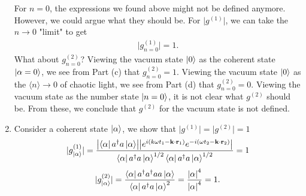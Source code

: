 \documentclass{article}
\theoremstyle{definition}
\newcommand{\al}{\alpha}
\newcommand{\f}[2]{\frac{#1}{#2}}
\begin{document}
\begin{enumerate}[label=\alph*)]
\noindent For $n=0$, the expressions we found above might not be defined anymore. However, we could argue what they should be. For $\vert g^{(1)} \vert$, we can take the $n\to 0$ "limit" to get
\begin{align*}
\vert g_{n=0}^{(1)}  \vert = 1.
\end{align*}
What about $g_{n=0}^{(2)}$? Viewing the vacuum state $\ket{0}$ as the coherent state $\ket{\al = 0}$, we see from Part (c) that $g^{(2)}_{n=0} = 1$. Viewing the vacuum state $\ket{0}$ as the $\langle n \rangle \to 0$ of chaotic light, we see from Part (d) that $g^{(2)}_{n=0} = 0$. Viewing the vacuum state as the number state $\ket{n=0}$, it is not clear what $g^{(2)}$ should be. From these, we conclude that $g^{(2)}$ for the vacuum state is not defined. 



\item Consider a coherent state $\ket{\al}$, we show that $\vert g^{(1)} \vert = \vert g^{(2)} \vert = 1$
\begin{align*}
\vert g^{(1)}_{\ket{\al}} \vert =  \f{\abs{\bra{\al} a^\dagger a \ket{\al}} 
\abs{ e^{i(k\omega t_1 - \mathbf{k} \cdot \mathbf{r}_1)}  e^{-i(\omega t_2 - \mathbf{k}\cdot \mathbf{r}_2)} }  
}{ \bra{\al} a^\dagger a \ket{\al}^{1/2}  \bra{\al} a^\dagger a \ket{\al}^{1/2} } 
= 
1
\end{align*}
\begin{align*}
\vert g^{(2)}_{\ket{\al}} \vert =  \f{ \bra{\al}  a^\dagger a^\dagger a a \ket{\al} }{ \bra{\al} a^\dagger a \ket{\al}^2 } = 
\f{\abs{\al}^4}{\abs{\al}^4}  = 1.
\end{align*} 


\end{enumerate}
\end{document}
